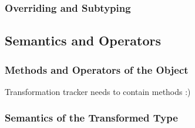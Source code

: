 \subsubsection{Overriding and Subtyping}

\subsection{Semantics and Operators}
\subsubsection{Methods and Operators of the Object}

Transformation tracker needs to contain methods :)

\subsubsection{Semantics of the Transformed Type}

